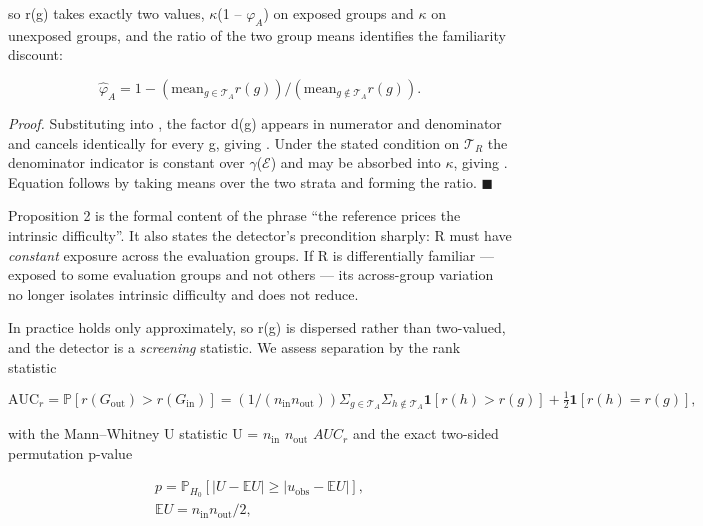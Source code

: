 so r(g) takes exactly two values, $\kappa$(1 -- $\varphi_{A}$) on exposed groups and $\kappa$ on unexposed groups, and the ratio of the two group means identifies the familiarity discount:

\begin{equation}
\label{eq:47}
\hat{\varphi }_A = 1 - ( \mathrm{mean}_{g \in \mathcal{T}_A} r(g) ) / ( \mathrm{mean}_{g \notin \mathcal{T}_A} r(g) ).
\end{equation}

\emph{Proof.} Substituting  into , the factor d(g) appears in numerator and denominator and cancels identically for every g, giving . Under the stated condition on $\mathcal{T}_{R}$ the denominator indicator is constant over $\gamma$($\mathcal{E}$) and may be absorbed into $\kappa$, giving . Equation  follows by taking means over the two strata and forming the ratio. $\blacksquare$

Proposition 2 is the formal content of the phrase ``the reference prices the intrinsic difficulty''. It also states the detector's precondition sharply: R must have \emph{constant} exposure across the evaluation groups. If R is differentially familiar --- exposed to some evaluation groups and not others --- its across-group variation no longer isolates intrinsic difficulty and  does not reduce.

In practice  holds only approximately, so r(g) is dispersed rather than two-valued, and the detector is a \emph{screening} statistic. We assess separation by the rank statistic

\begin{equation}
\label{eq:48}
\mathrm{AUC}_r = \mathbb{P}[ r(G_{\mathrm{out}}) > r(G_{\mathrm{in}}) ] = (1/(n_{\mathrm{in}} n_{\mathrm{out}})) \Sigma _{g \in \mathcal{T}_A} \Sigma _{h \notin \mathcal{T}_A} \mathbf{1}[ r(h) > r(g) ] + \tfrac{1}{2} \mathbf{1}[ r(h) = r(g) ],
\end{equation}

with the Mann--Whitney U statistic  U = $n_{\mathrm{in}}$ $n_{\mathrm{out}}$ $AUC_{r}$ and the exact two-sided permutation p-value

\begin{equation}
\label{eq:49}
\begin{aligned}
p = \mathbb{P}_{H_{0}}[ | U - \mathbb{E}U | \geq | u_{\mathrm{obs}} - \mathbb{E}U | ], \\
\mathbb{E}U = n_{\mathrm{in}} n_{\mathrm{out}} / 2,
\end{aligned}
\end{equation}

